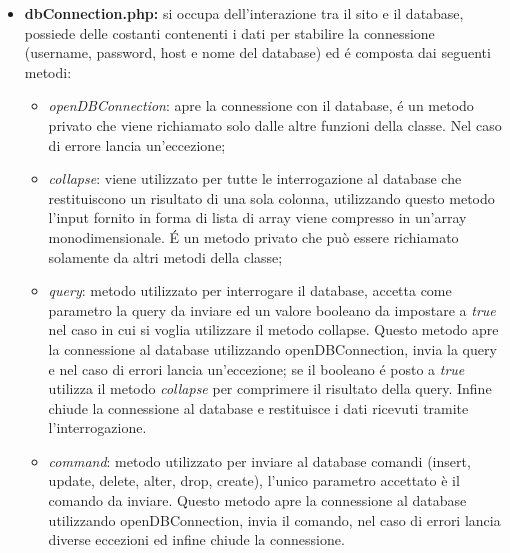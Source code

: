 \begin{itemize}
\begin{itemize}
		\item \textit{makeAccessdenied}: costruisce una pagina di errore nel caso in cui l'utente non abbia i permessi di vedere una determinata pagina.
		\item \textit{userInfo}: metodo utilizzato da \textit{dettagli account}, costruisce una lista con tutte le informazioni dell'account in cui si é loggati.
	\end{itemize}
\item \textbf{dbConnection.php:} si occupa dell'interazione tra il sito e il database, possiede delle costanti contenenti i dati per stabilire la connessione (username, password, host e nome del database) ed é composta dai seguenti metodi:
	\begin{itemize}
		\item \textit{openDBConnection}: apre la connessione con il database, é un metodo privato che viene richiamato solo dalle altre funzioni della classe. Nel caso di errore lancia un'eccezione;
		\item \textit{collapse}: viene utilizzato per tutte le interrogazione al database che restituiscono un risultato di una sola colonna, utilizzando questo metodo l'input fornito in forma di lista di array viene compresso in un'array monodimensionale. \'E un metodo privato che può essere richiamato solamente da altri metodi della classe;
		\item \textit{query}: metodo utilizzato per interrogare il database, accetta come parametro la query da inviare ed un valore booleano da impostare a \textit{true} nel caso in cui si voglia utilizzare il metodo collapse. Questo metodo apre la connessione al database utilizzando openDBConnection, invia la query e nel caso di errori lancia un'eccezione; se il booleano é posto a \textit{true} utilizza il metodo \textit{collapse} per comprimere il risultato della query. Infine chiude la connessione al database e restituisce i dati ricevuti tramite l'interrogazione.
		\item \textit{command}: metodo utilizzato per inviare al database comandi (insert, update, delete, alter, drop, create), l'unico parametro accettato è il comando da inviare. Questo metodo apre la connessione al database utilizzando openDBConnection, invia il comando, nel caso di errori lancia diverse eccezioni ed infine chiude la connessione.
	\end{itemize}
\end{itemize}
